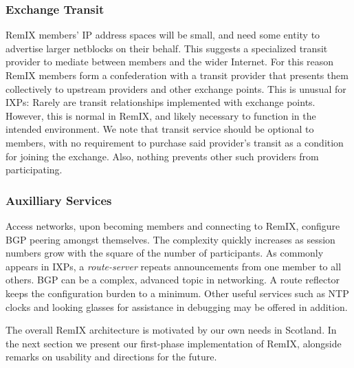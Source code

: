 \subsubsection{Exchange Transit}

RemIX members' IP address spaces will be small, and need some entity to
advertise larger netblocks on their behalf. This suggests a specialized transit
provider to mediate between members and the wider Internet. For this reason
RemIX members form a confederation with a transit provider that
presents them collectively to upstream providers and other exchange points. This
is unusual for \acp{IXP}: Rarely are transit relationships implemented with
exchange points. However, this is normal in RemIX, and likely necessary to
function in the intended environment. We note that transit service should be
optional to members, with no requirement to purchase said provider's transit as
a condition for joining the exchange. Also, nothing prevents other such
providers from participating.

\subsubsection{Auxilliary Services}

Access networks, upon becoming members and connecting to RemIX,
configure \acs{BGP} peering amongst themselves. The complexity quickly
increases as session numbers grow with the square of the number of
participants. As commonly appears in \acp{IXP}, a \emph{route-server}
repeats announcements from one member to all others. \acs{BGP} can be
a complex, advanced topic in networking. A route reflector keeps the
configuration burden to a minimum. Other useful services such as
\acs{NTP} clocks and looking glasses for assistance in debugging may
be offered in addition.


The overall RemIX architecture is motivated by our own needs in Scotland. In
the next section we present our first-phase implementation of RemIX,
alongside remarks on usability and directions for the future.

